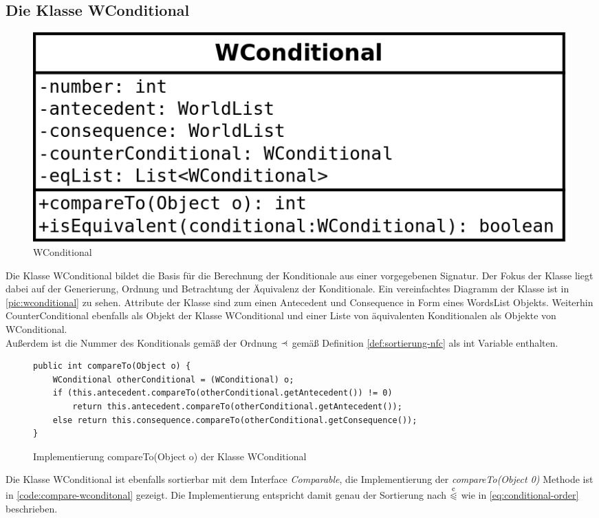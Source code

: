 \documentclass[12pt,a4paper]{article}
\newcommand\dotll{\mathrel{%
    \mathchoice{\QEQQ}{\QEQQ}{\QEQQ}{\QEQQ}%
}}
\def\QEQQ{{%
    \setbox0\hbox{$\leqslant$}%
    \rlap{\hbox to \wd0{\hss \raisebox {1pt}{$\ \cdot$\hss}}}\box0
}}
\newcommand\rdotl{\mathrel{%
    \mathchoice{\RQEQ}{\RQEQ}{\RQEQ}{\RQEQ}%
}}
\def\RQEQ{{%
    \setbox0\hbox{$\prec$}%
    \rlap{\hbox to \wd0{\hss \raisebox {0.01pt}{$\ \cdot$\hss}}}\box0
}}
\begin{document}
\subsection{Die Klasse WConditional} 

\begin{figure}
\includegraphics[width=0.55\linewidth]{bilder/wconditional.png}
\caption{WConditional}
\label{pic:wconditional}
\end{figure}

Die Klasse WConditional bildet die Basis für die Berechnung der Konditionale aus einer vorgegebenen Signatur. Der Fokus der Klasse liegt dabei auf der Generierung, Ordnung und Betrachtung der Äquivalenz der Konditionale. Ein vereinfachtes Diagramm der Klasse ist in \autoref{pic:wconditional} zu sehen. Attribute der Klasse sind zum einen Antecedent und Consequence in Form eines WordsList Objekts. Weiterhin CounterConditional ebenfalls als Objekt der Klasse WConditional und einer Liste von äquivalenten Konditionalen als Objekte von WConditional.\\
Außerdem ist die Nummer des Konditionals gemäß der Ordnung $\rdotl$ gemäß Definition \ref{def:sortierung-nfc} als int Variable enthalten.



\begin{figure}
\begin{lstlisting}
public int compareTo(Object o) {
    WConditional otherConditional = (WConditional) o;
    if (this.antecedent.compareTo(otherConditional.getAntecedent()) != 0)
        return this.antecedent.compareTo(otherConditional.getAntecedent());
    else return this.consequence.compareTo(otherConditional.getConsequence());
}
\end{lstlisting}
\caption{Implementierung compareTo(Object o) der Klasse WConditional}
\label{code:compare-wconditonal}
\end{figure}


Die Klasse WConditional ist ebenfalls sortierbar mit dem Interface \textit{Comparable}, die Implementierung der \textit{compareTo(Object 0)} Methode ist in \autoref{code:compare-wconditonal} gezeigt. Die Implementierung entspricht damit genau der Sortierung nach $\overset{\mathrm{c}}{\dotll}$ wie in \autoref{eq:conditional-order} beschrieben.
\end{document}
